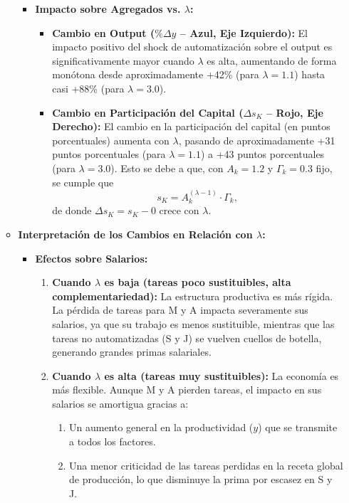 \documentclass{article}
\theoremstyle{remark}
\theoremstyle{definition}
\begin{document}
\begin{enumerate}
\begin{tcolorbox}[title= Soluci\'on 5]
\begin{itemize}
\begin{itemize}
      \item \textbf{Impacto sobre Agregados vs. \(\lambda\):}
        \begin{itemize}
          \item \textbf{Cambio en Output (\(\%\Delta y\) – Azul, Eje Izquierdo):} El impacto positivo del shock de automatizaci\'on sobre el output es significativamente mayor cuando \(\lambda\) es alta, aumentando de forma monótona desde aproximadamente +42\% (para \(\lambda=1.1\)) hasta casi +88\% (para \(\lambda=3.0\)).
          \item \textbf{Cambio en Participación del Capital (\(\Delta s_K\) – Rojo, Eje Derecho):} El cambio en la participación del capital (en puntos porcentuales) aumenta con \(\lambda\), pasando de aproximadamente +31 puntos porcentuales (para \(\lambda=1.1\)) a +43 puntos porcentuales (para \(\lambda=3.0\)). Esto se debe a que, con \(A_k=1.2\) y \(\Gamma_k=0.3\) fijo, se cumple que
            \[
            s_K = A_k^{(\lambda-1)}\cdot \Gamma_k,
            \]
            de donde \(\Delta s_K = s_K - 0\) crece con \(\lambda\).
        \end{itemize}
    \end{itemize}

  \item \textbf{Interpretación de los Cambios en Relación con \(\lambda\):}
    \begin{itemize}
      \item \textbf{Efectos sobre Salarios:}
        \begin{enumerate}[label=\alph*)]
          \item \textbf{Cuando \(\lambda\) es baja (tareas poco sustituibles, alta complementariedad):} La estructura productiva es más rígida. La pérdida de tareas para M y A impacta severamente sus salarios, ya que su trabajo es menos sustituible, mientras que las tareas no automatizadas (S y J) se vuelven cuellos de botella, generando grandes primas salariales.
          \item \textbf{Cuando \(\lambda\) es alta (tareas muy sustituibles):} La economía es más flexible. Aunque M y A pierden tareas, el impacto en sus salarios se amortigua gracias a: 
            \begin{enumerate}[label=\roman*)]
              \item Un aumento general en la productividad (\(y\)) que se transmite a todos los factores.
              \item Una menor criticidad de las tareas perdidas en la receta global de producción, lo que disminuye la prima por escasez en S y J.
            \end{enumerate}


\end{enumerate}
\end{itemize}
\end{itemize}
\end{tcolorbox}
\end{enumerate}
\end{document}
